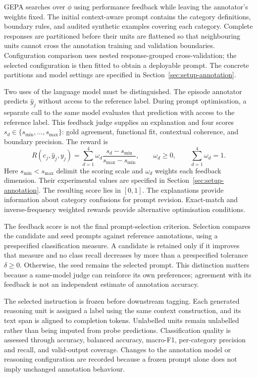 \documentclass[12pt,a4paper,twoside,openright]{book}
\begin{document}
GEPA searches over $\phi$ using performance feedback while leaving the
annotator's weights fixed. The initial context-aware prompt contains the
category definitions, boundary rules, and audited synthetic examples
covering each category. Complete responses are partitioned before their units
are flattened so that neighbouring units cannot cross the annotation
training and validation boundaries. Configuration comparison uses nested
response-grouped cross-validation; the selected configuration is then fitted
to obtain a deployable prompt. The concrete partitions and model settings
are specified in Section~\ref{sec:setup-annotation}.

Two uses of the language model must be distinguished. The episode annotator
predicts $\widehat y_j$ without access to the reference label. During prompt
optimisation, a separate call to the same model evaluates that prediction
with access to the reference label. This feedback judge supplies an
explanation and four scores $s_d\in\{s_{\min},\ldots,s_{\max}\}$: gold agreement,
functional fit, contextual coherence, and boundary precision. The reward is
\begin{equation}
  R(c_j,\widehat y_j,y_j)
  =\sum_{d=1}^{4}\omega_d
    \frac{s_d-s_{\min}}{s_{\max}-s_{\min}},
  \qquad
  \omega_d\geq0,\qquad \sum_{d=1}^{4}\omega_d=1.
  \label{eq:method-gepa-reward}
\end{equation}
Here $s_{\min}<s_{\max}$ delimit the scoring scale and $\omega_d$ weights
each feedback dimension. Their experimental values are specified in
Section~\ref{sec:setup-annotation}. The resulting score lies in $[0,1]$.
The explanations provide information
about category confusions for prompt revision. Exact-match and
inverse-frequency weighted rewards provide alternative optimisation
conditions.

The feedback score is not the final prompt-selection criterion. Selection
compares the candidate and seed prompts against reference annotations, using
a prespecified classification measure. A candidate is retained only if it
improves that measure and no class recall decreases by more than a
prespecified tolerance $\delta\geq0$. Otherwise,
the seed remains the selected prompt. This distinction matters because a
same-model judge can reinforce its own preferences; agreement with its
feedback is not an independent estimate of annotation accuracy.

The selected instruction is frozen before downstream tagging. Each generated
reasoning unit is assigned a label using the same context construction, and
its text span is aligned to completion tokens. Unlabelled units remain
unlabelled rather than being imputed from probe predictions. Classification
quality is assessed through accuracy, balanced accuracy, macro-F1,
per-category precision and recall, and valid-output coverage. Changes to the
annotation model or reasoning configuration are recorded because a frozen
prompt alone does not imply unchanged annotation behaviour.
\end{document}
